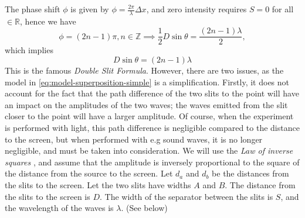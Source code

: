 \documentclass{paper}
\begin{document}
 The phase shift $\phi$ is given
by $\phi = \frac{2\pi}{\lambda}\Delta{x}$, and zero intensity requires $S = 0$ for all $\in\mathbb{R}$,
hence we have 
\begin{equation*}
    \phi = (2n-1)\pi, n\in\mathbb{Z} \implies \frac{1}{2}D\sin{\theta} = \frac{(2n-1)\lambda}{2},
\end{equation*}
which implies 
\begin{equation}
    \label{eq:double-slit-formula}
    D\sin{\theta} = (2n-1)\lambda
\end{equation}
This is the famous \textit{Double Slit Formula}. However, there are two issues,
as the model in \eqref{eq:model-superposition-simple} is a simplification.
Firstly, it does not account for the fact that the path difference of the two slits
to the point will have an impact on the amplitudes of the two waves; the waves emitted
from the slit closer to the point will have a larger amplitude. Of course, when the
experiment is performed with light, this path difference is negligible compared to
the distance to the screen, but when performed with e.g sound waves, it is no longer
negligible, and must be taken into consideration. We will use the \textit{Law of inverse squares} \parencite{inverse-square},
and assume that the amplitude is inversely proportional to the square of the distance
from the source to the screen. Let $d_a$ and $d_b$ be the distances from the slits
to the screen. Let the two slits have widths $A$ and $B.$
The distance from the slits to the screen is $D$. The width of the separator between the slits is $S$,
and the wavelength of the waves is $\lambda$.
(See  below)
\end{document}
